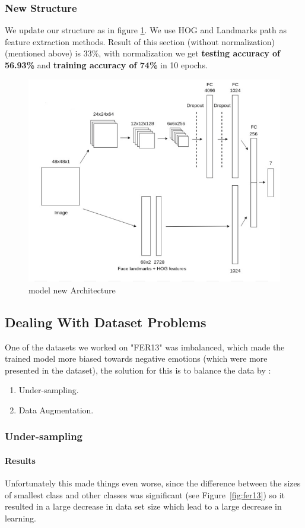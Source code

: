 \subsubsection{New Structure}
We update our structure as in figure \ref{arch}. 
We use HOG and Landmarks path as feature extraction methods.\newline
Result of this section (without normalization) (mentioned above) is 33\%,
with normalization we get \textbf{testing accuracy of 56.93\%} and \textbf{training accuracy of 74\%} in 10 epochs. 

\begin{figure}
	\centering
	\includegraphics[width=.7\textwidth]{images/Arch.png}
	\caption{model new Architecture}
	\label{arch}
\end{figure}

\subsection{Dealing With Dataset Problems}
One of the datasets we worked on "FER13" was imbalanced, which made the trained model more biased towards negative emotions (which were more presented in the dataset), the solution for this is to balance the data by :
\begin{enumerate}
	\item Under-sampling.
	\item Data Augmentation.
\end{enumerate}
\subsubsection{Under-sampling}
\paragraph{Results}
Unfortunately this made things even worse, since the difference between the sizes of smallest class and other classes was significant (see Figure~\ref{fig:fer13}) so it resulted in a large decrease in data set size which lead to a large decrease in learning.\newline

